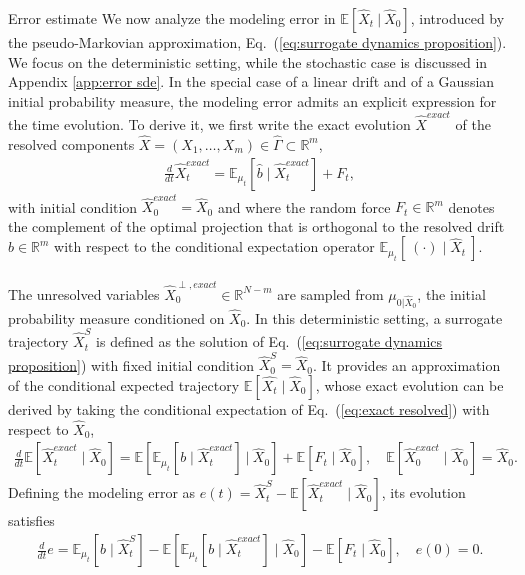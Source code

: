 \documentclass[11pt, a4paper, oneside, reqno]{amsart}
\makeatletter
\def\subsection{\@startsection{subsection}{2}%
	\z@{.5\linespacing\@plus.7\linespacing}{.5\linespacing}%
	{\normalfont\large\bfseries}}
\makeatother
\begin{document}
\subsection{Error estimate}\label{sec:error estimate}
\noindent We now analyze the modeling error in $\mathbb{E}[\hat{X}_t\: | \: \hat{X}_0]$, introduced by the pseudo-Markovian approximation, Eq.~(\ref{eq:surrogate dynamics proposition}). We focus on the deterministic setting, while the stochastic case is discussed in Appendix \ref{app:error sde}. 
In the special case of a linear drift and of a Gaussian initial probability measure, the modeling error admits an explicit expression for the time evolution.
To derive it, we first write the exact evolution $\hat{X}^{exact}$ of the resolved components $\hat{X}=(X_1,\dots,X_m)\in\hat{\Gamma}\subset\mathbb{R}^m$,
\begin{eqnarray}\label{eq:exact resolved}
    \frac{d}{dt}\hat{X}^{exact}_t = \mathbb{E}_{\mu_t}[\hat{b}\mid \hat{X}^{exact}_t] + F_t,
\end{eqnarray}
with initial condition $\hat{X}^{exact}_0 = \hat{X}_0$ and
where the random force $F_t \in \mathbb{R}^m$ denotes the complement of the optimal projection that is orthogonal to the resolved drift $\hat{b}\in\mathbb{R}^m$ with respect to the conditional expectation operator  $\mathbb{E}_{\mu_t}[\:(\cdot)\mid\hat{X}_t\:]$.
\\ \ \\
The unresolved variables $\hat{X}_0^{\perp ,exact} \in\mathbb{R}^{N-m}$ are sampled from $\mu_{0|\hat{X}_0}$, the initial probability measure conditioned on $\hat{X}_0$.  
In this deterministic setting, a surrogate trajectory $\hat{X}^S_t$ is defined as the solution of Eq.~(\ref{eq:surrogate dynamics proposition}) with fixed initial condition $\hat{X}^{S}_0 = \hat{X}_0$.
It provides an approximation of the conditional expected trajectory $\mathbb{E}[\hat{X_t}\mid\hat{X}_0]$, whose exact evolution can be derived by taking the conditional expectation of Eq.~(\ref{eq:exact resolved}) with respect to $\hat{X}_0$,
\begin{eqnarray}
    \frac{d}{dt}\mathbb{E}[\hat{X}^{exact}_t\mid \hat{X}_0] = \mathbb{E}\left[\mathbb{E}_{\mu_t}[b\mid\hat{X}^{exact}_t] \:\big|\: \hat{X}_0 \right] + \mathbb{E}[F_t\mid\hat{X}_0],\quad
    \mathbb{E}[\hat{X}_0^{exact}\mid\hat{X}_0] = \hat{X}_0.
\end{eqnarray}
Defining the modeling error as $e(t)=\hat{X}^S_t-\mathbb{E}[\hat{X}^{exact}_t\mid\hat{X}_0]$, its evolution satisfies
\begin{eqnarray}
    \frac{d}{dt}e = \mathbb{E}_{\mu_t}[b\mid\hat{X}^S_t] - \mathbb{E}\left[\mathbb{E}_{\mu_t}[b\mid\hat{X}^{exact}_t] \mid \hat{X}_0 \right] - \mathbb{E}[F_t\mid\hat{X}_0],\quad
    e(0)=0.
\end{eqnarray}
\end{document}
